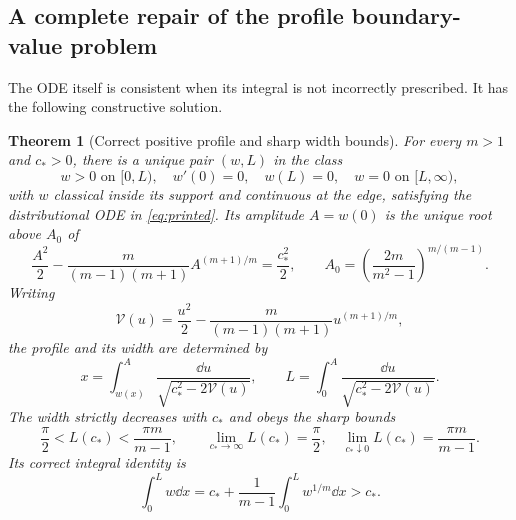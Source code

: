 \documentclass[11pt,a4paper]{article}
\newtheorem{theorem}{Theorem}[section]
\theoremstyle{remark}\newtheorem{remark}[theorem]{Remark}
\begin{document}
\subsection{A complete repair of the profile boundary-value problem}
The ODE itself is consistent when its integral is not incorrectly prescribed. It has the following constructive solution.
\begin{theorem}[Correct positive profile and sharp width bounds]\label{thm:repair}
For every $m>1$ and $c_*>0$, there is a unique pair $(w,L)$ in the class
\[
 w>0\text{ on }[0,L),\quad w'(0)=0,\quad w(L)=0,\quad
 w=0\text{ on }[L,\infty),
\]
with $w$ classical inside its support and continuous at the edge, satisfying the distributional ODE in \eqref{eq:printed}. Its amplitude $A=w(0)$ is the unique root above $A_0$ of
\begin{equation}
 \frac{A^2}{2}-\frac{m}{(m-1)(m+1)}A^{(m+1)/m}
 =\frac{c_*^2}{2},\qquad
 A_0=\left(\frac{2m}{m^2-1}\right)^{m/(m-1)}.\label{eq:amplitude}
\end{equation}
Writing
\[
 \mathcal V(u)=\frac{u^2}{2}-\frac{m}{(m-1)(m+1)}u^{(m+1)/m},
\]
the profile and its width are determined by
\begin{equation}
 x=\int_{w(x)}^A\frac{\dd u}{\sqrt{c_*^2-2\mathcal V(u)}},
 \qquad L=\int_0^A\frac{\dd u}{\sqrt{c_*^2-2\mathcal V(u)}}.\label{eq:profilequad}
\end{equation}
The width strictly decreases with $c_*$ and obeys the sharp bounds
\begin{equation}
 \frac\pi2<L(c_*)<\frac{\pi m}{m-1},\qquad
 \lim_{c_*\to\infty}L(c_*)=\frac\pi2,\quad
 \lim_{c_*\downarrow0}L(c_*)=\frac{\pi m}{m-1}.\label{eq:width}
\end{equation}
Its correct integral identity is
\begin{equation}
 \int_0^L w\dd x=c_*+\frac1{m-1}\int_0^L w^{1/m}\dd x>c_* .\label{eq:correctmass}
\end{equation}
\end{theorem}
\end{document}

